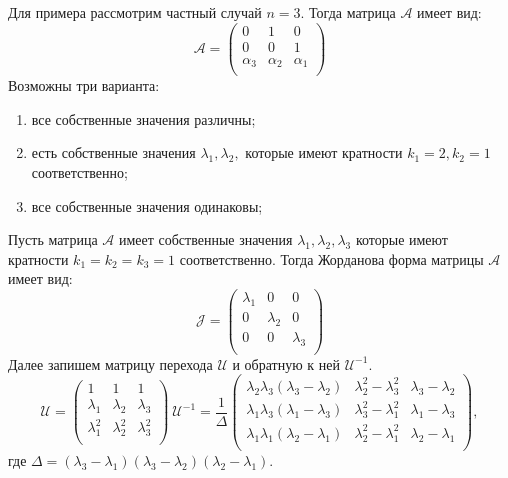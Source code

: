 Для примера рассмотрим частный случай $n=3.$ Тогда матрица $\mathcal{A}$ имеет вид:
$$
 \mathcal{A} = 
 \begin{pmatrix}
  0 & 1 & 0\\
  0 & 0 & 1 \\
  \alpha_3 & \alpha_2 & \alpha_1 \\
 \end{pmatrix}
$$
Возможны три варианта:
\begin{enumerate} %
\item все собственные значения различны;
\item есть собственные значения $\lambda_1, \lambda_2,$ которые имеют кратности $k_1=2, k_2=1$ соответственно; 
\item все собственные значения одинаковы;        
\end{enumerate}

Пусть матрица $\mathcal{A}$ имеет собственные значения $\lambda_1, \lambda_2, \lambda_3$ которые имеют кратности $k_1=k_2=k_3=1$ соответственно. Тогда Жорданова форма матрицы $\mathcal{A}$ имеет вид:
$$
 \mathcal{J} = 
 \begin{pmatrix}
  \lambda_1 & 0 & 0\\
  0 & \lambda_2 & 0 \\
  0 & 0 & \lambda_3 \\
 \end{pmatrix}
$$
Далее запишем матрицу перехода $\mathcal{U}$ и обратную к ней $\mathcal{U}^{-1}.$
$$
 \mathcal{U} = 
 \begin{pmatrix}
  1 & 1 & 1\\
  \lambda_1 & \lambda_2 & \lambda_3 \\
  \lambda_1^2 & \lambda_2^2 & \lambda_3^2 \\
 \end{pmatrix}
\  \mathcal{U}^{-1} = \frac{1}{\Delta} 
 \begin{pmatrix}
  \lambda_2\lambda_3(\lambda_3-\lambda_2) & \lambda_2^2-\lambda_3^2 & \lambda_3-\lambda_2\\
  \lambda_1\lambda_3(\lambda_1-\lambda_3) & \lambda_3^2-\lambda_1^2 & \lambda_1-\lambda_3\\
  \lambda_1\lambda_1(\lambda_2-\lambda_1) & \lambda_2^2-\lambda_1^2 & \lambda_2-\lambda_1\\
 \end{pmatrix},
$$
где $\Delta = (\lambda_3-\lambda_1)(\lambda_3-\lambda_2)(\lambda_2-\lambda_1).$